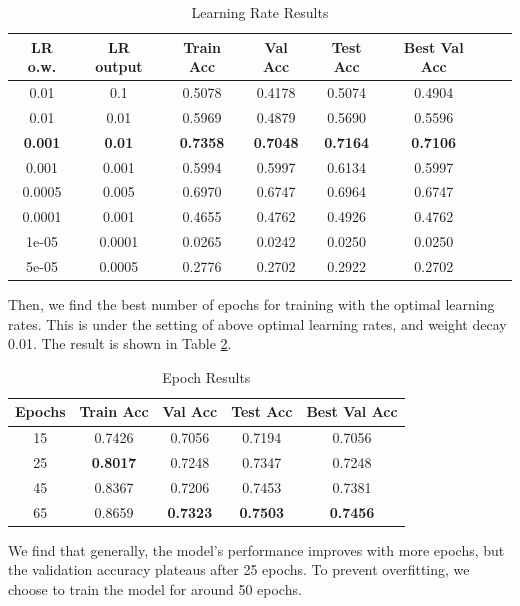 \documentclass[UTF8]{ctexart}
\begin{document}
\begin{table}[h]
    \centering
    \caption{Learning Rate Results}
    \label{tab:lr}
    \begin{tabular}{|c|c|c|c|c|c|c|c|}
    \hline
    \textbf{LR o.w.} & \textbf{LR output} & \textbf{Train Acc} & \textbf{Val Acc} & \textbf{Test Acc} & \textbf{Best Val Acc} \\ \hline
    0.01 & 0.1 & 0.5078 & 0.4178 & 0.5074 & 0.4904 \\ \hline
    0.01 & 0.01 & 0.5969 & 0.4879 & 0.5690 & 0.5596 \\ \hline
    \textbf{0.001} & \textbf{0.01} & \textbf{0.7358} & \textbf{0.7048} & \textbf{0.7164} & \textbf{0.7106} \\ \hline
    0.001 & 0.001 & 0.5994 & 0.5997 & 0.6134 & 0.5997 \\ \hline
    0.0005 & 0.005 & 0.6970 & 0.6747 & 0.6964 & 0.6747 \\ \hline
    0.0001 & 0.001 & 0.4655 & 0.4762 & 0.4926 & 0.4762 \\ \hline
    1e-05 & 0.0001 & 0.0265 & 0.0242 & 0.0250 & 0.0250 \\ \hline
    5e-05 & 0.0005 & 0.2776 & 0.2702 & 0.2922 & 0.2702 \\ \hline
    \end{tabular}
\end{table}

Then, we find the best number of epochs for training with the optimal learning rates. This is under
the setting of above optimal learning rates, and weight decay 0.01.
The result is shown in Table \ref{tab:epochs}.

\begin{table}[h]
    \centering
    \caption{Epoch Results}
    \label{tab:epochs}
    \begin{tabular}{|c|c|c|c|c|}
    \hline
    \textbf{Epochs} & \textbf{Train Acc} & \textbf{Val Acc} & \textbf{Test Acc} & \textbf{Best Val Acc} \\ \hline
    15 & 0.7426 & 0.7056 & 0.7194 & 0.7056 \\ \hline
    25 & \textbf{0.8017} & 0.7248 & 0.7347 & 0.7248 \\ \hline
    45 & 0.8367 & 0.7206 & 0.7453 & 0.7381 \\ \hline
    65 & 0.8659 & \textbf{0.7323} & \textbf{0.7503} & \textbf{0.7456} \\ \hline
    \end{tabular}
    \end{table}
We find that generally, the model's performance improves with more epochs, but the validation accuracy plateaus after 25 epochs.
To prevent overfitting, we choose to train the model for around 50 epochs.
\end{document}

